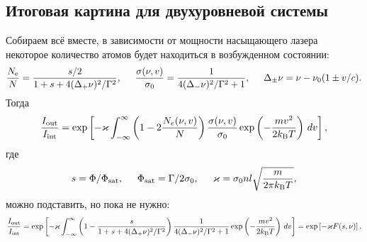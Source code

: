 \subsection{Итоговая картина для двухуровневой системы}


Собираем всё вместе, в зависимости от мощности насыщающего лазера некоторое количество атомов будет находиться в возбужденном состоянии:
\begin{equation*}
    \frac{\ne}{N} = \frac{s/2}{1 + s + 4 (\Delta_+ \nu)^2/\Gamma^2},
    \hspace{5 mm} 
    \frac{\sigma(\nu, v) }{\sigma_0} = \frac{1}{4 (\Delta_{-}\nu)^2 / \Gamma^2 + 1},
    \hspace{5 mm} 
    \Delta_{\pm} \nu = \nu - \nu_0(1\pm  v /c).
\end{equation*}
Тогда
\begin{equation}
    \frac{\sub{I}{out}}{\sub{I}{int}} = \exp\left[
        - \kappa
        \int_{-\infty}^{\infty} 
        \left(
            1 - 2 \frac{N_e (\nu, v)}{N}
        \right)
        \frac{\sigma(\nu, v)}{\sigma_0}  \exp\left(
        - \frac{m v^2}{2 \sub{k}{B} T} 
    \right) \d v
    \right]
    , 
\end{equation}
где
\begin{equation*}
    s = \Phi/\sub{\Phi}{sat},
    \hspace{5 mm} 
    \sub{\Phi}{sat} = \Gamma/2 \sigma_0,
    \hspace{5 mm}
    \kappa = \sigma_0 n l \sqrt{\frac{m}{2 \pi \sub{k}{B} T}},
\end{equation*}
можно подставить, но пока не нужно:
\begin{equation}
    \frac{\sub{I}{out}}{\sub{I}{int}} = \exp\left[
        - \kappa
        \int_{-\infty}^{\infty} 
        \left(
            1 - \frac{s}{1 + s + 4 (\Delta_+ \nu)^2/\Gamma^2}
        \right)
        \frac{1}{4 (\Delta_{-}\nu)^2 / \Gamma^2 + 1}  \exp\left(
        - \frac{m v^2}{2 \sub{k}{B} T} 
    \right) \d v
    \right] = \exp\left[
        - \kappa F(s, \nu)
    \right]
    .
    \label{maineq}
\end{equation}

